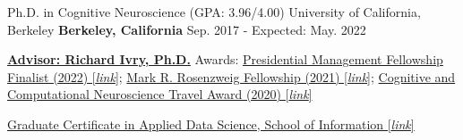 

\begin{cventries}

  \cventry
    {Ph.D. in Cognitive Neuroscience (GPA: 3.96/4.00)} %
    {University of California, Berkeley} %
    {\textbf{Berkeley, California}} %
    {Sep. 2017 - Expected: May. 2022} %
    {
      \begin{cvitems} %
        \item {{\href{http://ivrylab.berkeley.edu/rich-ivry.html}{\textbf{Advisor: Richard Ivry, Ph.D.}}} Awards: \href{https://apply.pmf.gov/finalists.aspx}{Presidential Management Fellowship Finalist (2022) [\textit{link}]}; \href{https://psychology.berkeley.edu/give/endowed-funds}{Mark R. Rosenzweig Fellowship (2021) [\textit{link}]}; \href{https://2021.ccneuro.org/index.php}{Cognitive and Computational Neuroscience Travel Award (2020) [\textit{link}]}}
        \item {{\href{https://www.ischool.berkeley.edu/programs/data-science-certificate}{Graduate Certificate in Applied Data Science, School of Information [\textit{link}]}}}
      \end{cvitems}
    }
    
    

\end{cventries}
